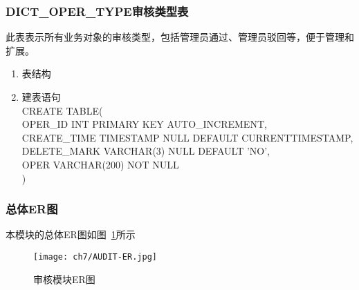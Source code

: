 \subsubsection{DICT\_OPER\_TYPE审核类型表}
此表表示所有业务对象的审核类型，包括管理员通过、管理员驳回等，便于管理和扩展。
\begin{enumerate}
    \item 表结构
    \begin{table}[htbp]
        \centering
        \end{table}
    \item 建表语句\\
        CREATE TABLE(\\
            OPER\_ID INT PRIMARY KEY AUTO\_INCREMENT,\\
            CREATE\_TIME TIMESTAMP NULL DEFAULT CURRENTTIMESTAMP,\\
            DELETE\_MARK VARCHAR(3) NULL DEFAULT 'NO',\\
            OPER VARCHAR(200) NOT NULL \\
        )
    \end{enumerate}

\subsubsection{总体ER图}
本模块的总体ER图如图~\ref{fig:AUDIT-ER}所示
\begin{figure}[htbp]
    \centering
    \texttt{[image: ch7/AUDIT-ER.jpg]}
    \caption{审核模块ER图}\label{fig:AUDIT-ER}
    \vspace{\baselineskip} %
\end{figure}


